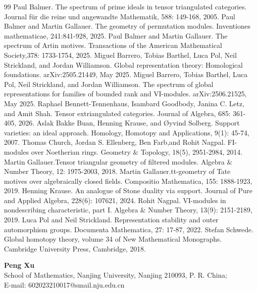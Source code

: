 \documentclass[11pt,a4paper]{amsart}
\numberwithin{equation}{section} \theoremstyle{plain}
\begin{document}
\renewcommand\refname{\bf References}
\begin{thebibliography}{99}
 Paul Balmer. The spectrum of prime ideals in tensor triangulated categories. Journal f\"{u}r die reine und angewandte Mathematik, 588: 149-168, 2005.
Paul Balmer and Martin Gallauer. The geometry of permutation modules.  Inventiones mathematicae, 241:841-928, 2025.
Paul Balmer and Martin Gallauer. The spectrum of Artin motives. Transactions of the American Mathematical Society,378: 1733-1754, 2025.
 Miguel Barrero, Tobias Barthel, Luca Pol, Neil Strickland, and Jordan Williamson. Global representation theory: Homological foundations. arXiv:2505.21449, May 2025.
Miguel Barrero, Tobias Barthel, Luca Pol, Neil Strickland, and Jordan Williamson. The spectrum of global representations for families of bounded rank and VI-modules. arXiv:2506.21525, May 2025.
Raphael Bennett-Tennenhaus, Isambard Goodbody, Janina C. Letz, and Amit Shah. Tensor extriangulated categories. Journal of Algebra, 685: 361-405, 2026.
Aslak Bakke Buan, Henning Krause, and {\O}yvind Solberg. Support varieties: an ideal approach. Homology, Homotopy and Applications, 9(1): 45-74, 2007.
 Thomas Church, Jordan S. Ellenberg, Ben Farb,and Rohit Nagpal. FI-modules over Noetherian rings. Geometry $\&$ Topology, 18(5), 2951-2984, 2014.
Martin Gallauer.Tensor triangular geometry of filtered modules. Algebra $\&$ Number Theory, 12: 1975-2003, 2018.
Martin Gallauer.tt-geometry of Tate motives over algebraically closed fields. Compositio Mathematica, 155: 1888-1923, 2019.
Henning Krause. An analogue of Stone duality via support. Journal of Pure and Applied Algebra, 228(6): 107621, 2024.
Rohit Nagpal. VI-modules in nondescribing characteristic, part I. Algebra $\&$ Number Theory, 13(9): 2151-2189, 2019.
Luca Pol and Neil Strickland. Representation stability and outer automorphism groups. Documenta Mathematica, 27: 17-87, 2022.
Stefan Schwede. Global homotopy theory, volume 34 of New Mathematical Monographs. Cambridge University Press, Cambridge, 2018.




\end{thebibliography}
\vspace{4mm}


\textbf{Peng Xu}\\
School of Mathematics, Nanjing University,
Nanjing 210093, P. R. China;\\
E-mail: \textsf{602023210017@smail.nju.edu.cn}\\[1mm]
\end{document}
